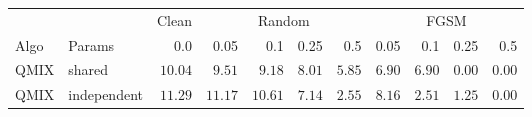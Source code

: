 \begin{tabular}{llrrrrrrrrr}
\toprule
& & Clean & \multicolumn{4}{c}{Random} & \multicolumn{4}{c}{FGSM} \\
\cmidrule(lr){4-7}\cmidrule(lr){8-11}
Algo & Params & 0.0 & 0.05 & 0.1 & 0.25 & 0.5 & 0.05 & 0.1 & 0.25 & 0.5 \\
\midrule
QMIX & shared      & $10.04$ & $9.51$  & $9.18$  & $8.01$ & $5.85$ & $6.90$ & $6.90$ & $0.00$ & $0.00$ \\
QMIX & independent & $11.29$ & $11.17$ & $10.61$ & $7.14$ & $2.55$ & $8.16$ & $2.51$ & $1.25$ & $0.00$ \\
\bottomrule
\end{tabular}
